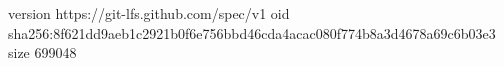 version https://git-lfs.github.com/spec/v1
oid sha256:8f621dd9aeb1c2921b0f6e756bbd46cda4acac080f774b8a3d4678a69c6b03e3
size 699048
